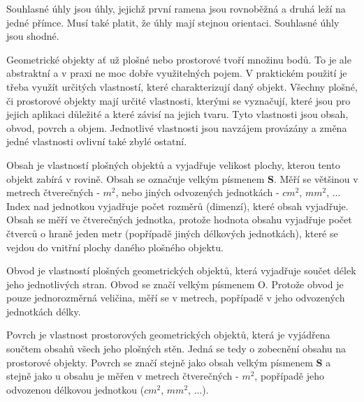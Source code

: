 Souhlasné úhly jsou úhly, jejichž první ramena jsou rovnoběžná a druhá leží na jedné přímce. Musí také platit, že úhly mají stejnou orientaci. Souhlasné úhly jsou shodné. 

\vskip 4mm
\centerline{}
\vskip 4mm


Geometrické objekty ať už plošné nebo prostorové tvoří množinu bodů. To je ale abstraktní a v praxi ne moc dobře využitelných pojem. V praktickém použití je třeba využít určitých vlastností, které charakterizují daný objekt. Všechny plošné, či prostorové objekty mají určité vlastnosti, kterými se vyznačují, které jsou pro jejich aplikaci důležité a které závisí na jejich tvaru. Tyto vlastnosti jsou obsah, obvod, povrch a objem. Jednotlivé vlastnosti jsou navzájem provázány a změna jedné vlastnosti ovlivní také zbylé ostatní.


Obsah je vlastností plošných objektů a vyjadřuje velikost plochy, kterou tento objekt zabírá v rovině. Obsah se označuje velkým písmenem {\bf S}. Měří se většinou v metrech čtverečných - $m^2$, nebo jiných odvozených jednotkách - $cm^2$, $mm^2$, ... Index nad jednotkou vyjadřuje počet rozměrů (dimenzí), které obsah vyjadřuje. Obsah se měří ve čtverečných jednotka, protože hodnota obsahu vyjadřuje počet čtverců o hraně jeden metr (popřípadě jiných délkových jednotkách), které se vejdou do vnitřní plochy daného plošného objektu.

\vskip 4mm
\centerline{}
\vskip 4mm


Obvod je vlastností plošných geometrických objektů, která vyjadřuje součet délek jeho jednotlivých stran. Obvod se značí velkým písmenem O. Protože obvod je pouze jednorozměrná veličina, měří se v metrech, popřípadě v jeho odvozených jednotkách délky. 

\vskip 4mm
\centerline{}
\vskip 4mm


Povrch je vlastnost prostorových geometrických objektů, která je vyjádřena součtem obsahů všech jeho plošných stěn. Jedná se tedy o zobecnění obsahu na prostorové objekty. Povrch se značí stejně jako obsah velkým písmenem {\bf S} a stejně jako u obsahu je měřen v metrech čtverečných - $m^2$, popřípadě jeho odvozenou délkovou jednotkou ($cm^2$, $mm^2$, ...).

